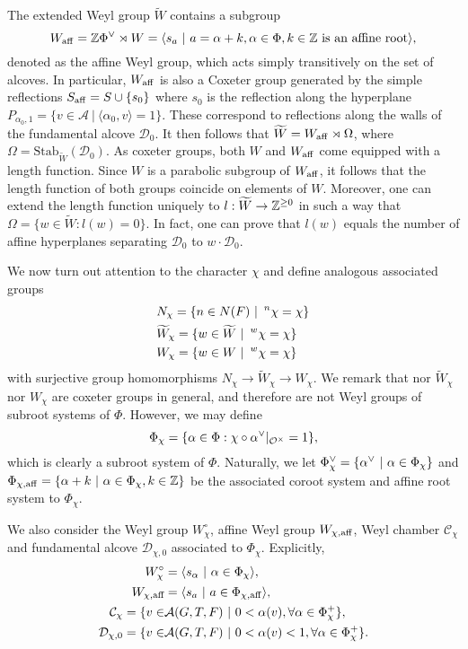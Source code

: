     The extended Weyl group $\widetilde{W}$ contains a subgroup $$W_{\aff}=\ZZ\vPhi\rtimes W=\langle s_a\ |\ a=\alpha+k,\alpha\in\Phi,k\in\ZZ \text{ is an affine root}\rangle,$$ denoted as the affine Weyl group, which acts simply transitively on the set of alcoves. In particular, $W_{\mathrm{aff}}$ is also a Coxeter group generated by the simple reflections $S_{\mathrm{aff}}=S\cup\{s_0\}$ where $s_0$ is the reflection along the hyperplane $P_{\alpha_0,1}=\{v\in\mathcal{A}\ |\ \langle\alpha_0,v\rangle=1\}$. These correspond to reflections along the walls of the fundamental alcove $\mathcal{D}_0$. It then follows that $\widetilde{W}=W_{\mathrm{aff}}\rtimes\Omega$, where $\Omega=\mathrm{Stab}_{\widetilde{W}}(\mathcal{D}_0)$. As coxeter groups, both $W$ and $W_{\mathrm{aff}}$ come equipped with a length function. Since $W$ is a parabolic subgroup of $W_{\mathrm{aff}}$, it follows that the length function of both groups coincide on elements of $W$. Moreover, one can extend the length function uniquely to $l:\widetilde{W}\rightarrow\mathbb{Z}^{\geq0}$ in such a way that $\Omega=\{w\in\widetilde{W}:l(w)=0\}$. In fact, one can prove that $l(w)$ equals the number of affine hyperplanes separating $\mathcal{D}_0$ to $w\cdot\mathcal{D}_0$.

    We now turn out attention to the character $\chi$ and define analogous associated groups
    \begin{align*}
        &N_{\chi}=\{n\in N(F)\ |\ \prescript{n}{}{\chi}=\chi\}\\
        &\widetilde{W}_{\chi}=\{w\in \widetilde{W}\ |\ \prescript{w}{}{\chi}=\chi\}\\
        &W_{\chi}=\{w\in W\ |\ \prescript{w}{}{\chi}=\chi\}
    \end{align*}
    with surjective group homomorphisms $N_\chi\rightarrow\widetilde{W}_\chi\rightarrow W_\chi$. We remark that nor $\widetilde{W}_\chi$ nor $W_\chi$ are coxeter groups in general, and therefore are not Weyl groups of subroot systems of $\Phi$. However, we may define $$\Phi_\chi=\{\alpha\in\Phi:\chi\circ\alpha^\vee|_{\mathcal{O}^\times}=1\},$$ which is clearly a subroot system of $\Phi$. Naturally, we let $\vPhi_\chi=\{\valpha\ |\ \alpha\in\Phi_\chi\}$ and $\Phi_{\chi,\aff}=\{\alpha+k\ |\ \alpha\in\Phi_\chi,k\in\ZZ\}$ be the associated coroot system and affine root system to $\Phi_\chi$. 
    
    We also consider the Weyl group $W_\chi^\circ$, affine Weyl group $W_{\chi,\mathrm{aff}}$, Weyl chamber $\mathcal{C}_\chi$ and fundamental alcove $\mathcal{D}_{\chi,0}$ associated to $\Phi_\chi$. Explicitly,
    \begin{align*}
        W_\chi^\circ&=\langle s_\alpha\ |\ \alpha\in\Phi_\chi\rangle,\\
        W_{\chi,\textrm{aff}}&=\langle s_a \ |\  a\in\Phi_{\chi,\aff}\rangle,\\
        \mathcal{C}_\chi=\{v\in&\mathcal{A}(G,T,F)\ |\ 0<\alpha(v), \forall\alpha\in\Phi_\chi^+\},\\
        \mathcal{D}_{\chi,0}=\{v\in&\mathcal{A}(G,T,F)\ |\ 0<\alpha(v)<1, \forall\alpha\in\Phi_\chi^+\}.
    \end{align*}

